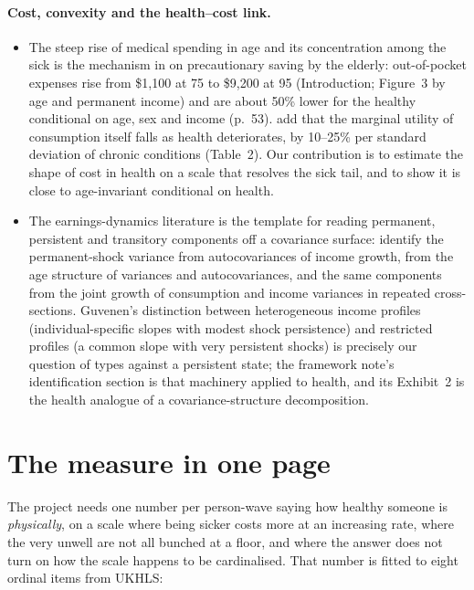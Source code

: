\documentclass[11pt]{article}
\begin{document}
\paragraph{Cost, convexity and the health--cost link.}
\begin{itemize}
\item The steep rise of medical spending in age and its concentration among the sick is the mechanism in \citet{denardi2010} on precautionary saving by the elderly: out-of-pocket expenses rise from \$1,100 at 75 to \$9,200 at 95 (Introduction; Figure~3 by age and permanent income) and are about 50\% lower for the healthy conditional on age, sex and income (p.~53). \citet{finkelstein2013} add that the marginal utility of consumption itself falls as health deteriorates, by 10--25\% per standard deviation of chronic conditions (Table~2). Our contribution is to estimate the shape of cost in health on a scale that resolves the sick tail, and to show it is close to age-invariant conditional on health.
\item The earnings-dynamics literature is the template for reading permanent, persistent and transitory components off a covariance surface: \citet[Section~3.2, eq.~5]{meghir2004} identify the permanent-shock variance from autocovariances of income growth, \citet[Section~4]{guvenen2009} from the age structure of variances and autocovariances, and \citet[Section~III.B]{blundell1998} the same components from the joint growth of consumption and income variances in repeated cross-sections. Guvenen's distinction between heterogeneous income profiles (individual-specific slopes with modest shock persistence) and restricted profiles (a common slope with very persistent shocks) is precisely our question of types against a persistent state; the framework note's identification section is that machinery applied to health, and its Exhibit~2 is the health analogue of a covariance-structure decomposition.
\end{itemize}

\section{The measure in one page}

The project needs one number per person-wave saying how healthy someone is
\emph{physically}, on a scale where being sicker costs more at an increasing
rate, where the very unwell are not all bunched at a floor, and where the
answer does not turn on how the scale happens to be cardinalised. That number
is fitted to eight ordinal items from UKHLS:
\end{document}
